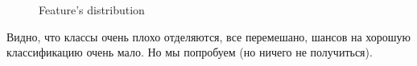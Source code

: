 \begin{figure}[H]
\caption{Feature's distribution}
\label{fig:image}
\end{figure}

Видно, что классы очень плохо отделяются, все перемешано, шансов на хорошую классификацию очень мало. Но мы попробуем (но ничего не получиться).

